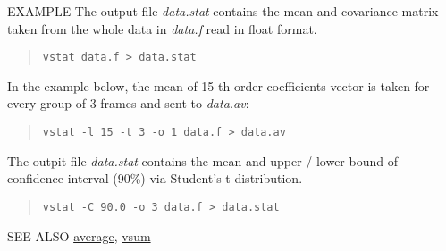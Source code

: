 \begin{qsection}{EXAMPLE}
The output file {\em data.stat} contains the mean and covariance matrix
taken from the whole data in {\em data.f} read in float format.
\begin{quote}
  \verb!vstat data.f > data.stat!
\end{quote}

In the example below, the mean of 15-th order coefficients vector is taken
for every group of 3 frames and sent to {\em data.av}:
\begin{quote}
  \verb!vstat -l 15 -t 3 -o 1 data.f > data.av!
\end{quote}

The outpit file {\em data.stat} contains the mean and upper / lower
bound of confidence interval (90\%) via Student's t-distribution.
\begin{quote}
  \verb!vstat -C 90.0 -o 3 data.f > data.stat!
\end{quote}
\end{qsection}

\begin{qsection}{SEE ALSO}
\hyperlink{average}{average},
\hyperlink{vsum}{vsum}
\end{qsection}
